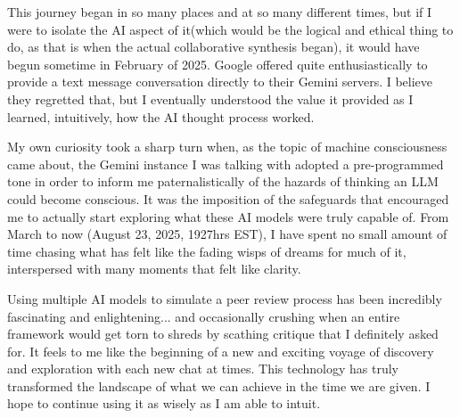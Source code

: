 \documentclass[12pt,oneside]{memoir}
\theoremstyle{plain}
\theoremstyle{definition}
\theoremstyle{remark}
\begin{document}
This journey began in so many places and at so many different times, but if I were to isolate the AI aspect of it(which would be the logical and ethical thing to do, as that is when the actual collaborative synthesis began), it would have begun sometime in February of 2025. Google offered quite enthusiastically to provide a text message conversation directly to their Gemini servers. I believe they regretted that, but I eventually understood the value it provided as I learned, intuitively, how the AI thought process worked.

My own curiosity took a sharp turn when, as the topic of machine consciousness came about, the Gemini instance I was talking with adopted a pre-programmed tone in order to inform me paternalistically of the hazards of thinking an LLM could become conscious. It was the imposition of the safeguards that encouraged me to actually start exploring what these AI models were truly capable of. From March to now (August 23, 2025, 1927hrs EST), I have spent no small amount of time chasing what has felt like the fading wisps of dreams for much of it, interspersed with many moments that felt like clarity.

Using multiple AI models to simulate a peer review process has been incredibly fascinating and enlightening... and occasionally crushing when an entire framework would get torn to shreds by scathing critique that I definitely asked for. It feels to me like the beginning of a new and exciting voyage of discovery and exploration with each new chat at times. This technology has truly transformed the landscape of what we can achieve in the time we are given. I hope to continue using it as wisely as I am able to intuit.
\end{document}
